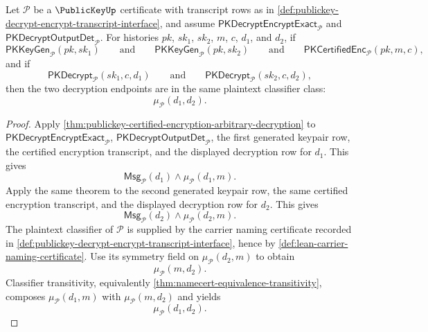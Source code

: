 \begin{theorem}
\label{thm:publickey-shared-public-key-decryption-consistency}
Let $\mathcal P$ be a $\PublicKeyUp$ certificate with transcript rows as in \autoref{def:publickey-decrypt-encrypt-transcript-interface}, and assume $\mathsf{PKDecryptEncryptExact}_{\mathcal P}$ and $\mathsf{PKDecryptOutputDet}_{\mathcal P}$. For histories $pk$, $sk_1$, $sk_2$, $m$, $c$, $d_1$, and $d_2$, if
$$
\mathsf{PKKeyGen}_{\mathcal P}(pk,sk_1)
\qquad\text{and}\qquad
\mathsf{PKKeyGen}_{\mathcal P}(pk,sk_2)
\qquad\text{and}\qquad
\mathsf{PKCertifiedEnc}_{\mathcal P}(pk,m,c),
$$
and if
$$
\mathsf{PKDecrypt}_{\mathcal P}(sk_1,c,d_1)
\qquad\text{and}\qquad
\mathsf{PKDecrypt}_{\mathcal P}(sk_2,c,d_2),
$$
then the two decryption endpoints are in the same plaintext classifier class:
$$
\mu_{\mathcal P}(d_1,d_2).
$$
\end{theorem}
\begin{proof}
Apply \autoref{thm:publickey-certified-encryption-arbitrary-decryption} to $\mathsf{PKDecryptEncryptExact}_{\mathcal P}$, $\mathsf{PKDecryptOutputDet}_{\mathcal P}$, the first generated keypair row, the certified encryption transcript, and the displayed decryption row for $d_1$. This gives
$$
\mathsf{Msg}_{\mathcal P}(d_1)\land\mu_{\mathcal P}(d_1,m).
$$
Apply the same theorem to the second generated keypair row, the same certified encryption transcript, and the displayed decryption row for $d_2$. This gives
$$
\mathsf{Msg}_{\mathcal P}(d_2)\land\mu_{\mathcal P}(d_2,m).
$$
The plaintext classifier of $\mathcal P$ is supplied by the carrier naming certificate recorded in \autoref{def:publickey-decrypt-encrypt-transcript-interface}, hence by \autoref{def:lean-carrier-naming-certificate}. Use its symmetry field on $\mu_{\mathcal P}(d_2,m)$ to obtain
$$
\mu_{\mathcal P}(m,d_2).
$$
Classifier transitivity, equivalently \autoref{thm:namecert-equivalence-transitivity}, composes $\mu_{\mathcal P}(d_1,m)$ with $\mu_{\mathcal P}(m,d_2)$ and yields
$$
\mu_{\mathcal P}(d_1,d_2).
$$
\end{proof}

